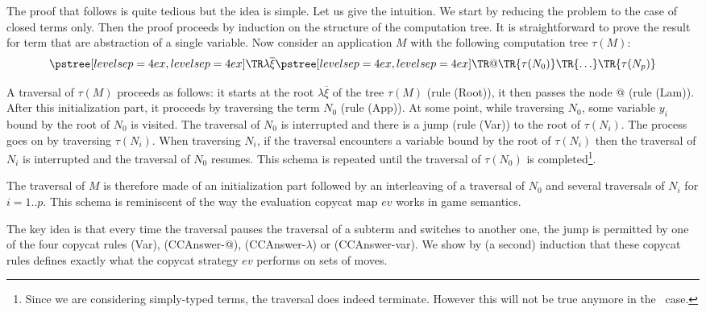 \begin{rem} The proof that follows is quite tedious but the idea is simple. Let us give the intuition.
    We start by reducing the problem to the case of closed terms only. Then the proof proceeds by induction on the structure of the computation tree.
    It is straightforward to prove the result for term that are abstraction of a single variable.
    Now consider an application $M$ with the following computation tree $\tau(M)$:
    $$ \tree[levelsep=4ex]{\lambda \overline{\xi}}
        { \tree[levelsep=4ex]{@}
            {   \TR{\tau(N_0)} \TR{\ldots} \TR{\tau(N_p)}}}
    $$

    A traversal of $\tau(M)$ proceeds as follows: it starts at the root $\lambda \overline{\xi}$ of the tree $\tau(M)$ (rule
    (Root)), it then passes the node @ (rule (Lam)).
    After this initialization part, it proceeds by traversing the term $N_0$ (rule (App)).
    At some point, while traversing $N_0$, some variable $y_i$ bound by the root of $N_0$ is visited. The traversal
    of $N_0$ is interrupted and there is a jump (rule (Var)) to the root of $\tau(N_i)$. The process goes on by traversing $\tau(N_i)$.
    When traversing $N_i$, if the traversal encounters a variable bound by the root of $\tau(N_i)$ then the traversal of $N_i$ is interrupted and
    the traversal of $N_0$ resumes.  This schema is repeated until the traversal of $\tau(N_0)$ is completed\footnote{Since we are considering
    simply-typed terms, the traversal does indeed terminate. However this will not be true anymore in the \pcf\ case.}.

    The traversal of $M$ is therefore made of an initialization part followed by an interleaving of a traversal of $N_0$ and
    several traversals of $N_i$ for $i=1..p$. This schema is reminiscent of the way the evaluation copycat map $ev$ works in game semantics.

    The key idea is that every time the traversal pauses the traversal of a subterm and switches to another one,
    the jump is permitted by one of the four copycat rules (Var), (CCAnswer-@), (CCAnswer-$\lambda$) or (CCAnswer-var).
    We show by (a second) induction that these copycat rules defines exactly what the copycat strategy $ev$ performs on sets of moves.


\end{rem}
